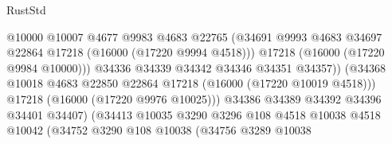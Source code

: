 \begin{lexlean}{RustStd}
\begin{coremodule}
                                              @10000
                                              @10007
                                              @4677
                                              @9983
                                              @4683
                                              @22765
                                              (@34691
                                                @9993
                                                @4683
                                                @34697
                                                @22864
                                                @17218
                                                (@16000 (@17220 @9994 @4518)))
                                              @17218
                                              (@16000 (@17220 @9984 @10000)))
                                            @34336
                                            @34339
                                            @34342
                                            @34346
                                            @34351
                                            @34357))
                                        (@34368
                                          @10018
                                          @4683
                                          @22850
                                          @22864
                                          @17218
                                          (@16000 (@17220 @10019 @4518)))
                                        @17218
                                        (@16000 (@17220 @9976 @10025)))
                                      @34386
                                      @34389
                                      @34392
                                      @34396
                                      @34401
                                      @34407)
                                    (@34413
                                      @10035
                                      @3290
                                      @3296
                                      @108
                                      @4518
                                      @10038
                                      @4518
                                      @10042
                                      (@34752
                                        @3290
                                        @108
                                        @10038
                                        (@34756
                                          @3289
                                          @10038

\end{coremodule}
\end{lexlean}
